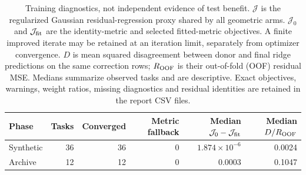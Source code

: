 \begin{table}[!htbp]
\centering\scriptsize\setlength{\tabcolsep}{4pt}
\caption{Training diagnostics, not independent evidence of test benefit. $\mathcal J$ is the regularized Gaussian residual-regression proxy shared by all geometric arms. $\mathcal J_0$ and $\mathcal J_{\rm fit}$ are the identity-metric and selected fitted-metric objectives. A finite improved iterate may be retained at an iteration limit, separately from optimizer convergence. $D$ is mean squared disagreement between donor and final ridge predictions on the same correction rows; $R_{\rm OOF}$ is their out-of-fold (OOF) residual MSE. Medians summarize observed tasks and are descriptive. Exact objectives, warnings, weight ratios, missing diagnostics and residual identities are retained in the report CSV files.}
\label{tab:target-diagnostics}
\begin{tabular}{lrrrrr}
\toprule
Phase & Tasks & Converged & Metric fallback & Median $\mathcal J_0-\mathcal J_{\rm fit}$ & Median $D/R_{\rm OOF}$ \\
\midrule
Synthetic & 36 & 36 & 0 & $1.874\times10^{-6}$ & 0.0024 \\
Archive & 12 & 12 & 0 & 0.0003 & 0.1047 \\
\bottomrule
\end{tabular}
\end{table}
